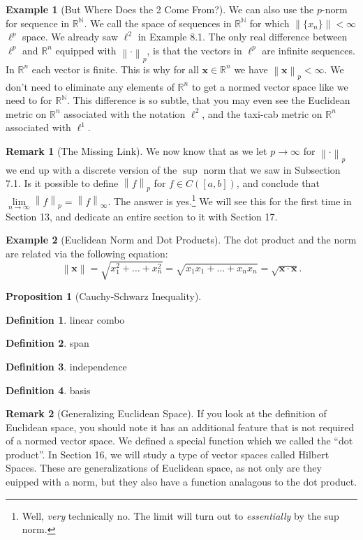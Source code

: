 \documentclass{article}
\newcommand{\N}{\mathbb{N}}
\newcommand{\R}{\mathbb{R}}
\newcommand{\x}{\mathbf{x}}
\newcommand{\norm}[1]{\left\lVert#1\right\rVert}
\theoremstyle{definition}
\newtheorem{proposition}{Proposition}[section]
\newtheorem{definition}{Definition}[section]
\newtheorem{example}{Example}[section]
\newtheorem{remark}{Remark}[section]
\begin{document}
\begin{example}[But Where Does the 2 Come From?]
	
	We can also use the $ p $-norm for sequence in $ \R^\N $. We call the space of sequences in $ \R^\N $ for which $ \norm{\{x_n\}}<\infty $ $ \ell^p $ space. We already saw $ \ell^2 $ in Example 8.1. The only real difference between $ \ell^p $ and $ \R^n $ equipped with $ \norm{\cdot}_p $, is that the vectors in $ \ell^p $ are infinite sequences. In $ \R^n $ each vector is finite. This is why for all $ \x\in\R^n $ we have $ \norm{\x}_p<\infty $. We don't need to eliminate any elements of $ \R^n $ to get a normed vector space like we need to for $ \R^\N $. This difference is so subtle, that you may even see the Euclidean metric on $ \R^n $ associated with the notation $ \ell^2 $, and the taxi-cab metric on $ \R^n $ associated with $ \ell^1 $.  
\end{example}
\begin{remark}[The Missing Link]
	We now know that as we let $ p\to\infty $ for $ \norm{\cdot}_p $ we end up with a discrete version of the $ \sup $ norm that we saw in Subsection 7.1. Is it possible to define $ \norm{f}_p $ for $ f\in C([a,b]) $, and conclude that $ \lim\limits_{n\to\infty}\norm{f}_p=\norm{f}_\infty $. The answer is yes.\footnote{Well, \textit{very} technically no. The limit will turn out to \textit{essentially} by the sup norm.} We will see this for the first time in Section 13, and dedicate an entire section to it with Section 17.
\end{remark}
\begin{example}[Euclidean Norm and Dot Products]
The dot product and the norm are related via the following equation:
$$ \norm{\x}=\sqrt{x_1^2+\ldots+x_n^2}=\sqrt{x_1x_1+\ldots+x_nx_n}=\sqrt{\x\cdot\x}.$$
\end{example}
\begin{proposition}[Cauchy-Schwarz Inequality]
	
\end{proposition}
\begin{definition}
	linear combo
\end{definition}
\begin{definition}
	span
\end{definition}
\begin{definition}
	independence 
\end{definition}
\begin{definition}
	basis
\end{definition}
\begin{remark}[Generalizing Euclidean Space]
If you look at the definition of Euclidean space, you should note it has an additional feature that is not required of a normed vector space. We defined a special function which we called the ``dot product''. In Section 16, we will study a type of vector spaces called Hilbert Spaces. These are generalizations of Euclidean space, as not only are they euipped with a norm, but they also have a function analagous to the dot product. 
\end{remark}
\end{document}
